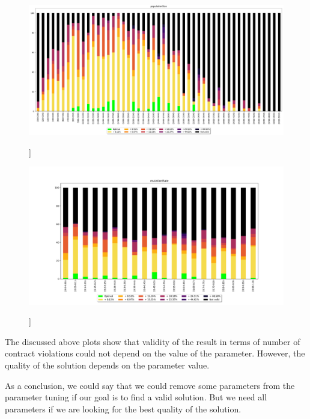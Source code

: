 \begin{figure}
	\centering
	\includegraphics[width=\textwidth]{images/populationSizeObjective.pdf}
	\caption[]]{}
	\label{fig:populationSizeObjective}
\end{figure}


\begin{figure}
	\centering
	\includegraphics[width=\textwidth]{images/mutationRateObjective.pdf}
	\caption[]]{}
	\label{fig:mutationRateObjective}
\end{figure}

The discussed above plots show that validity of the result in terms of number of contract violations could not depend on the value of the parameter. However, the quality of the solution depends on the parameter value. 

As a conclusion, we could say that we could remove some parameters from the parameter tuning if our goal is to find a valid solution. But we need all parameters if we are looking for the best quality of the solution.